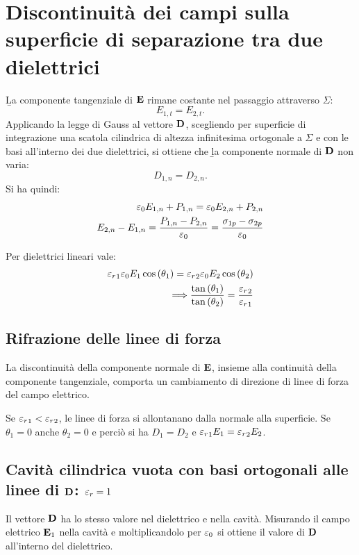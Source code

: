 \section{Discontinuità dei campi sulla superficie di separazione tra due dielettrici}%
\b{La componente tangenziale di $\mathbf{E}$ rimane costante} nel passaggio attraverso $\Sigma$: $$E_{1,t}=E_{2,t}.$$ Applicando la legge di Gauss al vettore $\mathbf{D}$, scegliendo per superficie di integrazione una scatola cilindrica di altezza infinitesima ortogonale a $\Sigma$ e con le basi all'interno dei due dielettrici, si ottiene che \b{la componente normale di $\mathbf{D}$ non varia}: $$D_{1,n}=D_{2,n}.$$ Si ha quindi:
\begin{equation}\begin{split}
\varepsilon_0E_{1,n}+P_{1,n}=\varepsilon_0E_{2,n}+P_{2,n}\\
E_{2,n}-E_{1,n}=\frac{P_{1,n}-P_{2,n}}{\varepsilon_0}=\frac{\sigma_{1p}-\sigma_{2p}}{\varepsilon_0}
\end{split}\end{equation}

Per \b{dielettrici lineari} vale:
\begin{equation}\begin{split}
{\varepsilon_r}_1\varepsilon_0E_1\cos{(\theta_1)}={\varepsilon_r}_2\varepsilon_0E_2\cos{(\theta_2)}\\
\Longrightarrow \frac{\tan{(\theta_1)}}{\tan{(\theta_2)}}=\frac{{\varepsilon_r}_2}{{\varepsilon_r}_1}
\end{split}\end{equation}

\subsection{Rifrazione delle linee di forza}
La discontinuità della componente normale di $\mathbf{E}$, insieme alla continuità della componente tangenziale, comporta un cambiamento di direzione di linee di forza del campo elettrico.

Se ${\varepsilon_r}_1<{\varepsilon_r}_2$, le linee di forza si allontanano dalla normale alla superficie. Se $\theta_1=0$ anche $\theta_2=0$ e perciò si ha $D_1=D_2$ e ${\varepsilon_r}_1E_1={\varepsilon_r}_2E_2$.

\subsection{Cavità cilindrica vuota con basi ortogonali alle linee di $\mathbf{D}$: ${\varepsilon_r}=1$}
Il vettore $\mathbf{D}$ ha lo stesso valore nel dielettrico e nella cavità. Misurando il campo elettrico $\mathbf{E}_1$ nella cavità e moltiplicandolo per $\varepsilon_0$ si ottiene il valore di $\mathbf{D}$ all'interno del dielettrico.

